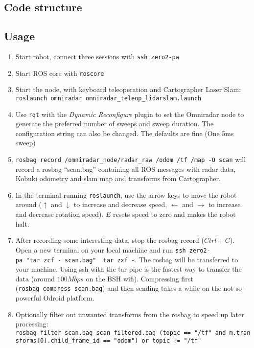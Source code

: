 \subsection{Code structure}\label{code-structure}

\subsection{Usage}\label{usage}

\begin{enumerate}
\def\labelenumi{\arabic{enumi}.}
\tightlist
\item
  Start robot, connect three sessions with \texttt{ssh\ zero2-pa}
\item
  Start ROS core with \texttt{roscore}
\item
  Start the node, with keyboard teleoperation and Cartographer Laser
  Slam:
  \texttt{roslaunch\ omniradar\ omniradar\_teleop\_lidarslam.launch}
\item
  Use \texttt{rqt} with the \emph{Dynamic Reconfigure} plugin to set the
  Omniradar node to generate the preferred number of sweeps and sweep
  duration. The configuration string can also be changed. The defaults
  are fine (One 5ms sweep)
\item
  \texttt{rosbag\ record\ /omniradar\_node/radar\_raw\ /odom\ /tf\ /map\ -O\ scan}
  will record a rosbag ``scan.bag'' containing all ROS messages with
  radar data, Kobuki odometry and slam map and transforms from
  Cartographer.
\item
  In the terminal running \texttt{roslaunch}, use the arrow keys to move
  the robot around (\(\uparrow\) and \(\downarrow\) to increase and
  decrease speed, \(\leftarrow\) and \(\rightarrow\) to increase and
  decrease rotation speed). \(E\) resets speed to zero and makes the
  robot halt.
\item
  After recording some interesting data, stop the rosbag record
  (\(Ctrl+C\)). Open a new terminal on your local machine and run
  \texttt{ssh\ zero2-pa\ "tar\ zcf\ -\ scan.bag"\ \textbar{}\ tar\ zxf\ -}.
  The rosbag will be transferred to your machine. Using ssh with the tar
  pipe is the fastest way to transfer the data (around \(100 Mbps\) on
  the BSH wifi). Compressing first (\texttt{rosbag\ compress\ scan.bag})
  and then sending takes a while on the not-so-powerful Odroid platform.
\item
  Optionally filter out unwanted transforms from the rosbag to speed up
  later processing:
  \texttt{rosbag\ filter\ scan.bag\ scan\_filtered.bag\ \textquotesingle{}(topic\ ==\ "/tf"\ and\ m.transforms{[}0{]}.child\_frame\_id\ ==\ "odom")\ or\ topic\ !=\ "/tf"\textquotesingle{}}

\end{enumerate}
